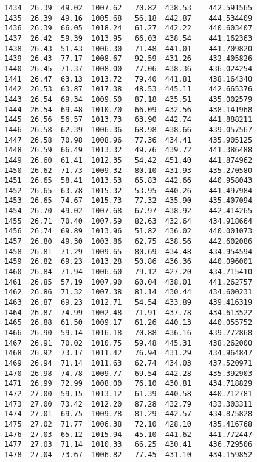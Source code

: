 \documentclass[11pt]{article}
\begin{document}
\begin{tcolorbox}[breakable, size=fbox, boxrule=.5pt, pad at break*=1mm, opacityfill=0]
\begin{Verbatim}[commandchars=\\\{\}]
1434  26.39  49.02  1007.62   70.82  438.53    442.591565
1435  26.39  49.16  1005.68   56.18  442.87    444.534409
1436  26.39  66.05  1018.24   61.27  442.22    440.603407
1437  26.42  59.39  1013.95   66.03  438.54    441.162363
1438  26.43  51.43  1006.30   71.48  441.01    441.709820
1439  26.43  77.17  1008.67   92.59  431.26    432.405826
1440  26.45  71.37  1008.00   77.06  438.36    436.024254
1441  26.47  63.13  1013.72   79.40  441.81    438.164340
1442  26.53  63.87  1017.38   48.53  445.11    442.665376
1443  26.54  69.34  1009.50   87.18  435.51    435.002579
1444  26.54  69.48  1010.70   66.09  432.56    438.141968
1445  26.56  56.57  1013.73   63.90  442.74    441.888211
1446  26.58  62.39  1006.36   68.98  438.66    439.057567
1447  26.58  70.98  1008.96   77.36  434.41    435.905125
1448  26.59  66.49  1013.32   49.76  439.72    441.386488
1449  26.60  61.41  1012.35   54.42  451.40    441.874962
1450  26.62  71.73  1009.32   80.10  431.93    435.270580
1451  26.65  58.41  1013.53   65.83  442.66    440.958043
1452  26.65  63.78  1015.32   53.95  440.26    441.497984
1453  26.65  74.67  1015.73   77.32  435.90    435.407094
1454  26.70  49.02  1007.68   67.97  438.92    442.414265
1455  26.71  70.40  1007.59   82.63  432.64    434.918664
1456  26.74  69.89  1013.96   51.82  436.02    440.001073
1457  26.80  49.30  1003.86   62.75  438.56    442.602086
1458  26.81  71.29  1009.65   80.69  434.48    434.954594
1459  26.82  69.23  1013.28   50.86  436.36    440.096001
1460  26.84  71.94  1006.60   79.12  427.20    434.715410
1461  26.85  57.19  1007.90   60.04  438.01    441.262757
1462  26.86  71.32  1007.38   81.14  430.44    434.600231
1463  26.87  69.23  1012.71   54.54  433.89    439.416319
1464  26.87  74.99  1002.48   71.91  437.78    434.613522
1465  26.88  61.50  1009.17   61.26  440.13    440.055752
1466  26.90  59.14  1016.18   70.88  436.16    439.772868
1467  26.91  70.02  1010.75   59.48  445.31    438.262000
1468  26.92  73.17  1011.42   76.94  431.29    434.964847
1469  26.94  71.14  1011.63   62.74  434.03    437.520971
1470  26.98  74.78  1009.77   69.54  442.28    435.392903
1471  26.99  72.99  1008.00   76.10  430.81    434.718829
1472  27.00  59.15  1013.12   61.39  440.58    440.712781
1473  27.00  73.42  1012.20   87.28  432.79    433.303311
1474  27.01  69.75  1009.78   81.29  442.57    434.875828
1475  27.02  71.77  1006.38   72.10  428.10    435.416768
1476  27.03  65.12  1015.94   45.10  441.62    441.772447
1477  27.03  71.14  1010.33   66.25  430.41    436.729506
1478  27.04  73.67  1006.82   77.45  431.10    434.159852

\end{Verbatim}
\end{tcolorbox}
\end{document}
